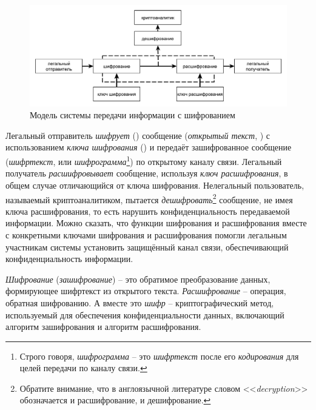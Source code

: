 \begin{figure}[!thb]
	\centering
	\includegraphics[width=1.0\textwidth]{pic/model-cipher}
	\caption{Модель системы передачи информации с шифрованием\label{pic:model-cipher}}
\end{figure}

Легальный отправитель \emph{шифрует} () сообщение (\emph{открытый текст}, ) с использованием \emph{ключа шифрования} () и передаёт зашифрованное сообщение (\emph{шифртекст},  или \emph{шифрограмма}\footnote{Строго говоря, \emph{шифрограмма} -- это \emph{шифртекст} после его \emph{кодирования} для целей передачи по каналу связи.}) по открытому каналу связи. Легальный получатель \emph{расшифровывает} сообщение, используя \emph{ключ расшифрования}, в общем случае отличающийся от ключа шифрования. Нелегальный пользователь, называемый криптоаналитиком, пытается \emph{дешифровать}\footnote{Обратите внимание, что в англоязычной литературе словом <<\textit{decryption}>> обозначается и расшифрование, и дешифрование.} сообщение, не имея ключа расшифрования, то есть нарушить конфиденциальность передаваемой информации. Можно сказать, что функции шифрования и расшифрования вместе с конкретными ключами шифрования и расшифрования помогли легальным участникам системы установить защищённый канал связи, обеспечивающий конфиденциальность информации.

\emph{Шифрование} (\emph{зашифрование}) -- это обратимое преобразование данных, формирующее шифртекст из открытого текста. \emph{Расшифрование} -- операция, обратная шифрованию. А вместе это \emph{шифр} -- криптографический метод, используемый для обеспечения конфиденциальности данных, включающий алгоритм зашифрования и алгоритм расшифрования.~\cite{GOST-89}

